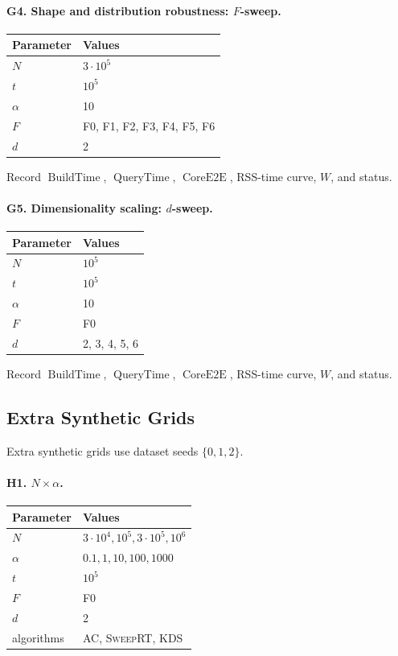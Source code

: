 \documentclass[11pt]{article}
\newcommand{\AC}{\textsc{AC}}
\newcommand{\SweepRT}{\textsc{SweepRT}}
\newcommand{\KDS}{\textsc{KDS}}
\newcommand{\BuildTime}{\ensuremath{\operatorname{BuildTime}}}
\newcommand{\QueryTime}{\ensuremath{\operatorname{QueryTime}}}
\newcommand{\CoreE}{\ensuremath{\operatorname{CoreE2E}}}
\begin{document}
\paragraph{G4. Shape and distribution robustness: $F$-sweep.}
\begin{center}
\begin{tabularx}{0.82\linewidth}{@{}lY@{}}
\toprule
Parameter & Values \\
\midrule
$N$ & $3\cdot10^5$ \\
$t$ & $10^5$ \\
$\alpha$ & 10 \\
$F$ & F0, F1, F2, F3, F4, F5, F6 \\
$d$ & 2 \\
\bottomrule
\end{tabularx}
\end{center}
Record \BuildTime, \QueryTime, \CoreE, RSS-time curve, $W$, and status.

\paragraph{G5. Dimensionality scaling: $d$-sweep.}
\begin{center}
\begin{tabularx}{0.82\linewidth}{@{}lY@{}}
\toprule
Parameter & Values \\
\midrule
$N$ & $10^5$ \\
$t$ & $10^5$ \\
$\alpha$ & 10 \\
$F$ & F0 \\
$d$ & 2, 3, 4, 5, 6 \\
\bottomrule
\end{tabularx}
\end{center}
Record \BuildTime, \QueryTime, \CoreE, RSS-time curve, $W$, and status.

\subsection{Extra Synthetic Grids}
Extra synthetic grids use dataset seeds $\{0,1,2\}$.

\paragraph{H1. $N\times\alpha$.}
\begin{center}
\begin{tabularx}{0.82\linewidth}{@{}lY@{}}
\toprule
Parameter & Values \\
\midrule
$N$ & $3\cdot10^4,10^5,3\cdot10^5,10^6$ \\
$\alpha$ & $0.1,1,10,100,1000$ \\
$t$ & $10^5$ \\
$F$ & F0 \\
$d$ & 2 \\
algorithms & \AC, \SweepRT, \KDS \\
\bottomrule
\end{tabularx}
\end{center}
\end{document}
